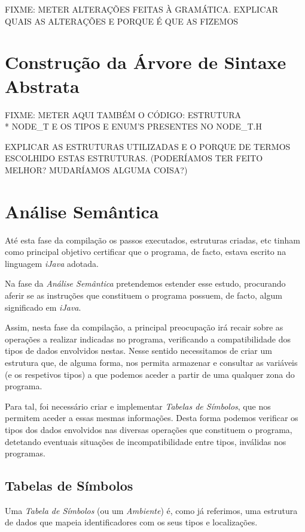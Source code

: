 \documentclass[11pt,a4paper]{article}
\begin{document}
FIXME: METER ALTERAÇÕES FEITAS À GRAMÁTICA. EXPLICAR QUAIS AS ALTERAÇÕES E PORQUE É QUE AS FIZEMOS

\pagebreak

\section{Construção da Árvore de Sintaxe Abstrata}

FIXME: METER AQUI TAMBÉM O CÓDIGO: ESTRUTURA \\* NODE\_T E OS TIPOS E ENUM'S PRESENTES NO NODE\_T.H

EXPLICAR AS ESTRUTURAS UTILIZADAS E O PORQUE DE TERMOS ESCOLHIDO ESTAS ESTRUTURAS. (PODERÍAMOS TER FEITO MELHOR? MUDARÍAMOS ALGUMA COISA?)

\pagebreak

\section{Análise Semântica}

	Até esta fase da compilação os passos executados, estruturas criadas, etc tinham como principal objetivo certificar que o programa, de facto, estava escrito na linguagem \emph{iJava} adotada.
	
	Na fase da \emph{Análise Semântica} pretendemos estender esse estudo, procurando aferir se as instruções que constituem o programa possuem, de facto, algum significado em \emph{iJava}.
	
	Assim, nesta fase da compilação, a principal preocupação irá recair sobre as operações a realizar indicadas no programa, verificando a compatibilidade dos tipos de dados envolvidos nestas. Nesse sentido necessitamos de criar um estrutura que, de alguma forma, nos permita armazenar e consultar as variáveis (e os respetivos tipos) a que podemos aceder a partir de uma qualquer zona do programa.
	
	Para tal, foi necessário criar e implementar \emph{Tabelas de Símbolos}, que nos permitem aceder a essas mesmas informações. Desta forma podemos verificar os tipos dos dados envolvidos nas diversas operações que constituem o programa, detetando eventuais situações de incompatibilidade entre tipos, inválidas nos programas.

	\subsection{Tabelas de Símbolos}
	
	Uma \emph{Tabela de Símbolos} (ou um \emph{Ambiente}) é, como já referimos, uma estrutura de dados que mapeia identificadores com os seus tipos e localizações.
	
\end{document}
